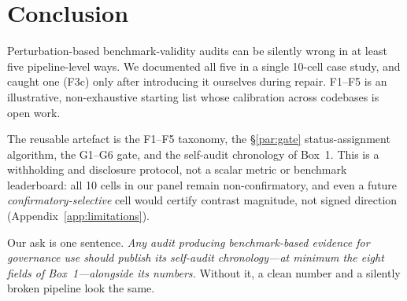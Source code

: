 \section{Conclusion}
\label{sec:conclusion}

Perturbation-based benchmark-validity audits can be silently wrong
in at least five pipeline-level ways. We documented all five in a
single 10-cell case study, and caught one (F3c) only after
introducing it ourselves during repair. F1--F5 is an illustrative,
non-exhaustive starting list whose calibration across codebases is
open work.

The reusable artefact is the F1--F5 taxonomy, the
\S\ref{par:gate} status-assignment algorithm, the G1--G6 gate, and
the self-audit chronology of Box~1. This is a withholding and
disclosure protocol, not a scalar metric or benchmark leaderboard:
all 10 cells in our panel remain non-confirmatory, and even a future
\emph{confirmatory-selective} cell would certify contrast magnitude,
not signed direction (Appendix~\ref{app:limitations}).

Our ask is one sentence. \emph{Any audit producing benchmark-based
evidence for governance use should publish its self-audit
chronology---at minimum the eight fields of
Box~1---alongside its numbers.} Without it, a
clean number and a silently broken pipeline look the same.
